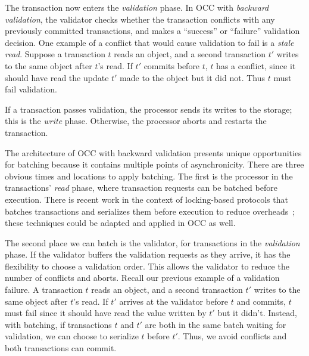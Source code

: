 The transaction now enters the \emph{validation} phase. In OCC with \emph{backward validation}, the validator checks whether the transaction conflicts with any previously committed transactions, and makes a ``success'' or ``failure'' validation decision. One example of a conflict that would cause validation to fail is a \emph{stale read}. Suppose a transaction $t$ reads an object, and a second transaction $t'$ writes to the same object after $t$'s read. If $t'$ commits before $t$, $t$ has a conflict, since it should have read the update $t'$ made to the object but it did not. Thus $t$ must fail validation. 


If a transaction passes validation, the processor sends its writes to the storage; this is the \emph{write} phase. Otherwise, the processor aborts and restarts the transaction.

The architecture of OCC with backward validation presents unique opportunities for batching because it contains multiple points of asynchronicity. 
There are three obvious times and locations to apply batching. The first is the processor in the transactions' \emph{read} phase, where transaction requests can be batched before execution. There is recent work in the context of locking-based protocols that  batches transactions and serializes them before execution to reduce overheads~\cite{thomson2012calvin,faleiro2014rethinking,mu2014extracting}; these techniques could be adapted and applied in OCC as well.

The second place we can batch is the validator, for transactions in the \emph{validation} phase. If the validator buffers the validation requests as they arrive, it has the flexibility to choose a validation order. This allows the validator to reduce the number of conflicts and aborts. Recall our previous example of a validation failure. A transaction $t$ reads an object, and a second transaction $t'$ writes to the same object after $t$'s read. If $t'$ arrives at the validator before $t$ and commits, $t$ must fail since it should have read the value written by $t'$ but it didn't. Instead, with batching, if transactions $t$ and $t'$ are both in the same batch waiting for validation, we can choose to serialize $t$ before $t'$. Thus, we avoid conflicts and both transactions can commit.

